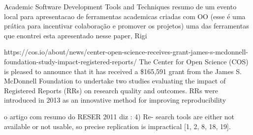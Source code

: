 Academic Software Development Tools and Techniques
resumo de um evento local para apresentacao de ferramentas academicas criadas com OO
(esse é uma prática para incentivar colaboração e promover os projetos)
uma das ferramentas que enontrei esta apresentado nesse paper, Rigi

https://cos.io/about/news/center-open-science-receives-grant-james-s-mcdonnell-foundation-study-impact-registered-reports/
The Center for Open Science (COS) is pleased to announce that it has received a
\$165,591 grant from the James S. McDonnell Foundation to undertake two studies
evaluating the impact of Registered Reports (RRs) on research quality and
outcomes. RRs were introduced in 2013 as an innovative method for improving
reproducibility

o artigo com resumo do RESER 2011 diz \cite{knutson2010report}:
4) Re-
search tools are either not available or not usable, so precise
replication is impractical [1, 2, 8, 18, 19].

%
%
%
%
%
%

